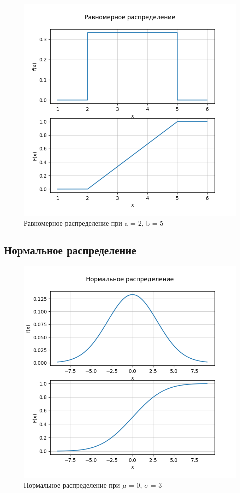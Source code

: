 \begin{figure}[h!]
  \centering
  \includegraphics[scale=0.65]{1/uniform2}
  \caption{Равномерное распределение при a = 2, b = 5}
\end{figure}
\pagebreak

\subsection{Нормальное распределение}
\begin{figure}[h!]
  \centering
  \includegraphics[scale=0.65]{1/norm1}
  \caption{Нормальное распределение при $\mu$ = 0, $\sigma$ = 3}
\end{figure}

